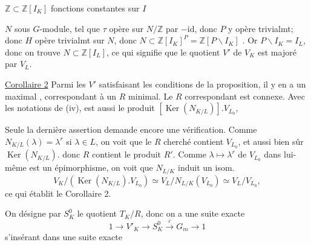 
$\mathbb Z\subset\mathbb Z[I_K]$ fonctions constantes sur $I$


$N$ sous $G$-module, tel que $\tau$ opère sur $N/\mathbb Z$ par $-\mathrm{id}$,
donc $P$ y opère trivialmt; donc $H$ opère trivialmt sur $N$, donc
$N\subset\mathbb Z[I_K]^P=\mathbb Z[P\backslash I_K]$
.
Or $P\backslash I_K=I_L$, donc on trouve \deleted{$\subset$}
$N\subset\mathbb Z[I_L]$, ce qui signifie que le quotient $V'$ de $V_K$ est majoré par $V_L$.


\uline{Corollaire 2} Parmi les $V'$ satisfaisant les conditions de la proposition,
il y en a un maximal 
, correspondant à un $R$ minimal.
Le $R$ correspondant est connexe. Avec les notations de (iv),
est aussi le produit $[\operatorname{Ker}(N_{K/L})].V_{L_0}$,

Seule la dernière assertion demande encore une vérification.
Comme $N_{K/L}(\lambda)=\lambda^r$ si $\lambda\in L$, on voit que le $R$ cherché
contient $V_{L_0}$, et aussi bien sûr $\operatorname{Ker}(N_{K/L})$.
 donc $R$ contient le produit $R'$.
 Comme $\lambda\mapsto\lambda^r$ de $V_{L_0}$ dans lui-même est un épimorphisme,
on voit que $N_{L/K}$ induit un isom.
\[
V_K/(\operatorname{Ker}(N_{K/L}).V_{L_0})\simeq
V_L/N_{L/K}(V_{L_0})\simeq V_L/V_{L_0},
\]
ce qui établit le Corollaire 2.

On désigne par $S_K^0$ le quotient $T_K/R$, donc on a une suite exacte
\margin{\deleted{\unsure{$(*)$}}}
\[
1\longrightarrow V'_K\longrightarrow S_K^0\xrightarrow{\varepsilon}G_m\longrightarrow1
\]
s'insérant dans une suite exacte

